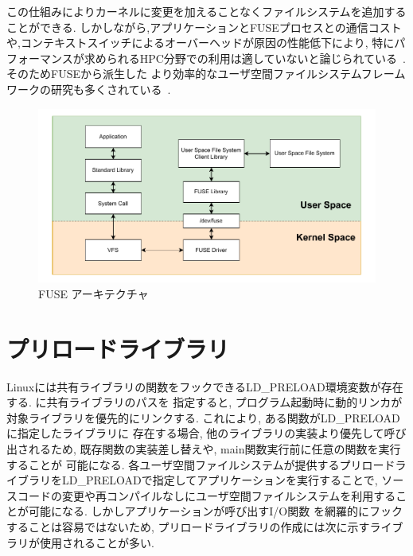 \documentclass[a4paper,11pt]{jreport}
\begin{document}
この仕組みによりカーネルに変更を加えることなくファイルシステムを追加することができる. 
しかしながら,アプリケーションとFUSEプロセスとの通信コストや,コンテキストスイッチによるオーバーヘッドが原因の性能低下により, 
特にパフォーマンスが求められるHPC分野での利用は適していないと論じられている~\cite{brinkmann2020ad}. そのためFUSEから派生した
より効率的なユーザ空間ファイルシステムフレームワークの研究も多くされている~\cite{294791, zhu2018direct, 3494556}. 

\newpage


\begin{figure}[h]
	\begin{minipage}[b]{1\columnwidth}
		\centering
		\includegraphics[width=0.9\linewidth]{./figure/FUSE.pdf}
		\caption{FUSE アーキテクチャ}
		\label{fig:FUSE}
	\end{minipage}
\end{figure}

\newpage


\section{プリロードライブラリ}
Linuxには共有ライブラリの関数をフックできるLD\_PRELOAD環境変数が存在する. に共有ライブラリのパスを
指定すると, プログラム起動時に動的リンカが対象ライブラリを優先的にリンクする. これにより, ある関数がLD\_PRELOADに指定したライブラリに
存在する場合, 他のライブラリの実装より優先して呼び出されるため, 既存関数の実装差し替えや, main関数実行前に任意の関数を実行することが
可能になる. 各ユーザ空間ファイルシステムが提供するプリロードライブラリをLD\_PRELOADで指定してアプリケーションを実行することで, 
ソースコードの変更や再コンパイルなしにユーザ空間ファイルシステムを利用することが可能になる. しかしアプリケーションが呼び出すI/O関数
を網羅的にフックすることは容易ではないため, プリロードライブラリの作成には次に示すライブラリが使用されることが多い. 
\end{document}

